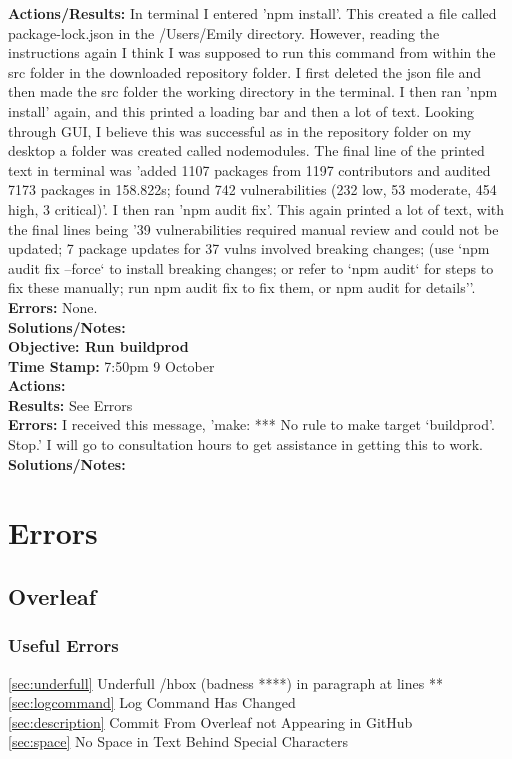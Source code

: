 \documentclass{article}
\begin{document}
\begin{FlushLeft}
\textbf{Actions/Results:} In terminal I entered 'npm install'. This created a file called package-lock.json in the /Users/Emily directory. However, reading the instructions again I think I was supposed to run this command from within the src folder in the downloaded repository folder. I first deleted the json file and then made the src folder the working directory in the terminal. I then ran 'npm install' again, and this printed a loading bar and then a lot of text. Looking through GUI, I believe this was successful as in the repository folder on my desktop a folder was created called node\textunderscore modules. The final line of the printed text in terminal was 'added 1107 packages from 1197 contributors and audited 7173 packages in 158.822s; found 742 vulnerabilities (232 low, 53 moderate, 454 high, 3 critical)'. I then ran 'npm audit fix'. This again printed a lot of text, with the final lines being '39 vulnerabilities required manual review and could not be updated; 7 package updates for 37 vulns involved breaking changes; (use `npm audit fix --force` to install breaking changes; or refer to `npm audit` for steps to fix these manually; run npm audit fix to fix them, or npm audit for details''. \\
\textbf{Errors:} None.\\
\textbf{Solutions/Notes:}\\
\vspace{5mm}
\textbf{Objective: Run build\textunderscore prod}\\ 
\textbf{Time Stamp:} 7:50pm 9 October\\
\textbf{Actions:} \\
\textbf{Results:} See Errors\\
\textbf{Errors:} I received this message, 'make: *** No rule to make target `build\textunderscore prod'.  Stop.' I will go to consultation hours to get assistance in getting this to work.\\
\textbf{Solutions/Notes:} \\

\pagebreak

\section{Errors}
\subsection{Overleaf}

\subsubsection{Useful Errors}
\autoref{sec:underfull} Underfull /hbox (badness ****) in paragraph at lines **\\
\autoref{sec:logcommand} Log Command Has Changed\\
\autoref{sec:description} Commit From Overleaf not Appearing in GitHub\\
\autoref{sec:space} No Space in Text Behind Special Characters


\end{FlushLeft}
\end{document}
